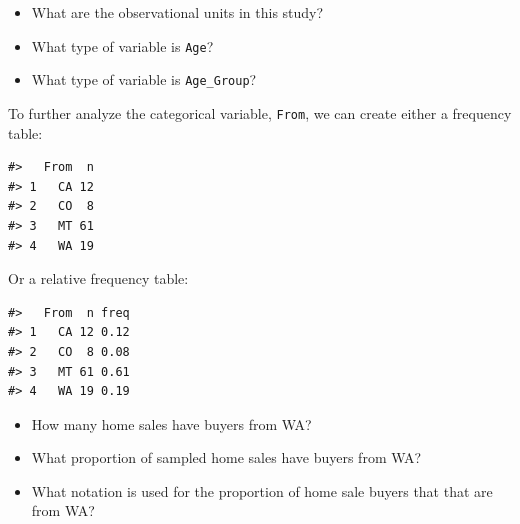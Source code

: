 \documentclass[
]{report}
\providecommand{\tightlist}{%
  \setlength{\itemsep}{0pt}\setlength{\parskip}{0pt}}
\begin{document}
\begin{itemize}
\tightlist
\item
  What are the observational units in this study?
\end{itemize}

\vspace{0.3in}

\begin{itemize}
\tightlist
\item
  What type of variable is \texttt{Age}?
\end{itemize}

\vspace{0.3in}

\begin{itemize}
\tightlist
\item
  What type of variable is \texttt{Age\_Group}?
\end{itemize}

To further analyze the categorical variable, \texttt{From}, we can create either a frequency table:

\begin{verbatim}
#>   From  n
#> 1   CA 12
#> 2   CO  8
#> 3   MT 61
#> 4   WA 19
\end{verbatim}

Or a relative frequency table:

\begin{verbatim}
#>   From  n freq
#> 1   CA 12 0.12
#> 2   CO  8 0.08
#> 3   MT 61 0.61
#> 4   WA 19 0.19
\end{verbatim}

\begin{itemize}
\tightlist
\item
  How many home sales have buyers from WA?
\end{itemize}

\vspace{0.2in}

\begin{itemize}
\tightlist
\item
  What proportion of sampled home sales have buyers from WA?
\end{itemize}

\vspace{0.2in}

\begin{itemize}
\tightlist
\item
  What notation is used for the proportion of home sale buyers that that are from WA?
\end{itemize}
\end{document}
